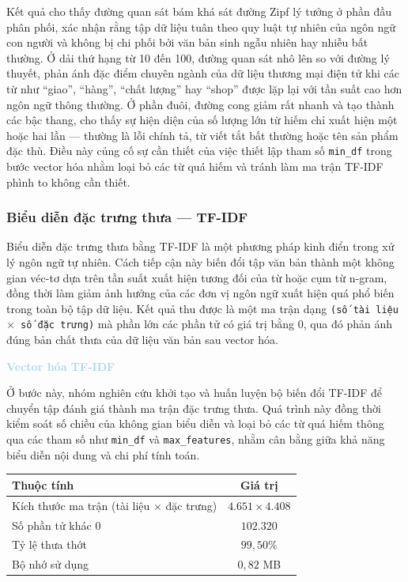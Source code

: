 Kết quả cho thấy đường quan sát bám khá sát đường Zipf lý tưởng ở phần đầu phân phối, xác nhận rằng tập dữ liệu tuân theo quy luật tự nhiên của ngôn ngữ con người và không bị chi phối bởi văn bản sinh ngẫu nhiên hay nhiễu bất thường. Ở dải thứ hạng từ 10 đến 100, đường quan sát nhô lên so với đường lý thuyết, phản ánh đặc điểm chuyên ngành của dữ liệu thương mại điện tử khi các từ như ``giao'', ``hàng'', ``chất lượng'' hay ``shop'' được lặp lại với tần suất cao hơn ngôn ngữ thông thường. Ở phần đuôi, đường cong giảm rất nhanh và tạo thành các bậc thang, cho thấy sự hiện diện của số lượng lớn từ hiếm chỉ xuất hiện một hoặc hai lần --- thường là lỗi chính tả, từ viết tắt bất thường hoặc tên sản phẩm đặc thù. Điều này củng cố sự cần thiết của việc thiết lập tham số \texttt{min\_df} trong bước vector hóa nhằm loại bỏ các từ quá hiếm và tránh làm ma trận TF-IDF phình to không cần thiết.

\subsubsection{Biểu diễn đặc trưng thưa --- TF-IDF}

Biểu diễn đặc trưng thưa bằng TF-IDF là một phương pháp kinh điển trong xử lý ngôn ngữ tự nhiên. Cách tiếp cận này biến đổi tập văn bản thành một không gian véc-tơ dựa trên tần suất xuất hiện tương đối của từ hoặc cụm từ n-gram, đồng thời làm giảm ảnh hưởng của các đơn vị ngôn ngữ xuất hiện quá phổ biến trong toàn bộ tập dữ liệu. Kết quả thu được là một ma trận dạng \texttt{(số tài liệu $\times$ số đặc trưng)} mà phần lớn các phần tử có giá trị bằng 0, qua đó phản ánh đúng bản chất thưa của dữ liệu văn bản sau vector hóa.

\vspace{0.5em}
\noindent\textcolor{lightblue}{\textbf{Vector hóa TF-IDF}}\par
\vspace{0.5em}
Ở bước này, nhóm nghiên cứu khởi tạo và huấn luyện bộ biến đổi TF-IDF để chuyển tập đánh giá thành ma trận đặc trưng thưa. Quá trình này đồng thời kiểm soát số chiều của không gian biểu diễn và loại bỏ các từ quá hiếm thông qua các tham số như \texttt{min\_df} và \texttt{max\_features}, nhằm cân bằng giữa khả năng biểu diễn nội dung và chi phí tính toán.

\begin{center}
\renewcommand{\arraystretch}{1.4}
\begin{tabularx}{0.75\textwidth}{|X|c|}
\hline
\rowcolor[HTML]{E8E8E8}
\textbf{Thuộc tính} & \textbf{Giá trị} \\
\hline
Kích thước ma trận (tài liệu $\times$ đặc trưng) & $4.651 \times 4.408$ \\
\hline
Số phần tử khác 0 & $102.320$ \\
\hline
Tỷ lệ thưa thớt & $99,50\%$ \\
\hline
Bộ nhớ sử dụng & $0,82$ MB \\
\hline
\end{tabularx}
\end{center}

